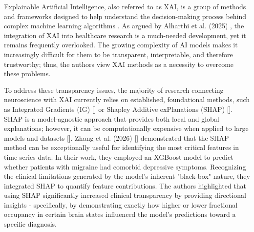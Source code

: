 \documentclass{article}
\begin{document}
Explainable Artificial Intelligence, also referred to as XAI, is a group of methods and frameworks designed to help understand the decision-making process behind complex machine learning algorithms \cite{puthanveettil2025review}. As argued by Alharthi et al. (2025) \cite{alharthi2025explainable}, the integration of XAI into healthcare research is a much-needed development, yet it remains frequently overlooked. The growing complexity of AI models makes it increasingly difficult for them to be transparent, interpretable, and therefore trustworthy; thus, the authors view XAI methods as a necessity to overcome these problems.

To address these transparency issues, the majority of research connecting neuroscience with XAI currently relies on established, foundational methods, such as Integrated Gradients (IG) [\cite{sundararajan2017axiomatic}] or Shapley Additive exPlanations (SHAP) [\cite{lundberg2017unified}]. SHAP is a model-agnostic approach that provides both local and global explanations; however, it can be computationally expensive when applied to large models and datasets [\cite{alharthi2025explainable}]. Zhang et al. (2026) [\cite{zhang2026unveiling}] demonstrated that the SHAP method can be exceptionally useful for identifying the most critical features in time-series data. In their work, they employed an XGBoost model to predict whether patients with migraine had comorbid depressive symptoms. Recognizing the clinical limitations generated by the model's inherent "black-box" nature, they integrated SHAP to quantify feature contributions. The authors highlighted that using SHAP significantly increased clinical transparency by providing directional insights - specifically, by demonstrating exactly how higher or lower fractional occupancy in certain brain states influenced the model's predictions toward a specific diagnosis.
\end{document}

